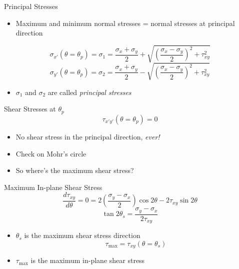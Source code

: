 \documentclass[10pt, svgnames]{beamer}
\begin{document}
\begin{frame}[label={sec:org2f314de}]{Principal Stresses}
\begin{itemize}
\item Maximum and minimum normal stresses = normal stresses at principal
direction
\end{itemize}

\[\sigma_{x'} (\theta = \theta_p) = \sigma_1 = \dfrac{\sigma_x + \sigma_y}{2} + \sqrt{ \left( \dfrac{\sigma_x - \sigma_y}{2} \right)^2 + \tau_{xy}^2 }\]
\[\sigma_{y'} (\theta = \theta_p) = \sigma_2 = \dfrac{\sigma_x + \sigma_y}{2} - \sqrt{ \left( \dfrac{\sigma_x - \sigma_y}{2} \right)^2 + \tau_{xy}^2 }\]

\begin{itemize}
\item \(\sigma_1\) and \(\sigma_2\) are called \emph{principal stresses}
\end{itemize}
\end{frame}

\begin{frame}[label={sec:orga975a3f}]{Shear Stresses at \(\theta_p\)}
\[\tau_{x'y'} (\theta = \theta_p) = 0\]

\begin{itemize}
\item No shear stress in the principal direction, \emph{ever!}

\item Check on Mohr's circle

\item So where's the maximum shear stress?
\end{itemize}
\end{frame}

\begin{frame}[label={sec:org19359af}]{Maximum In-plane Shear Stress}
\[\dfrac{d\tau_{xy}}{d\theta} = 0 = 2\left( \dfrac{\sigma_y - \sigma_x}{2} \right) \cos 2\theta - 2\tau_{xy} \sin 2\theta\]
\[\tan 2\theta_s = \dfrac{\sigma_y - \sigma_x}{2\tau_{xy}}\]

\begin{itemize}
\item \(\theta_s\) is the maximum shear stress direction
\[\tau_{\max} = \tau_{xy} (\theta = \theta_s)\]

\item \(\tau_{\max}\) is the maximum in-plane shear stress
\end{itemize}
\end{frame}
\end{document}
